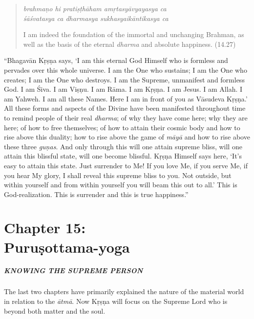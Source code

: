 \documentclass[12pt, twoside, openright]{memoir}
\begin{document}
\par
\begin{verse}
\textit{brahmaṇo hi pratiṣṭhāham amṛtasyāvyayasya ca} \\
\textit{śāśvatasya ca dharmasya sukhasyaikāntikasya ca}

\noindent I am indeed the foundation of the immortal and unchanging Brahman, as well as the basis of the eternal \textit{dharma} and absolute happiness. (14.27)
\end{verse}
\par



\enquote{Bhagavān Kṛṣṇa says, \enquote{I am this eternal God Himself who is formless and pervades over this whole universe. I am the One who sustains; I am the One who creates; I am the One who destroys. I am the Supreme, unmanifest and formless God. I am Śiva. I am Viṣṇu. I am Rāma. I am Kṛṣṇa. I am Jesus. I am Allah. I am Yahweh. I am all these Names. Here I am in front of you as Vāsudeva Kṛṣṇa.} All these forms and aspects of the Divine have been manifested throughout time to remind people of their real \textit{dharma}; of why they have come here; why they are here; of how to free themselves; of how to attain their cosmic body and how to rise above this duality; how to rise above the game of \textit{māyā} and how to rise above these three \textit{guṇas}. And only through this will one attain supreme bliss, will one attain this blissful state, will one become blissful. Kṛṣṇa Himself says here, \enquote{It’s easy to attain this state. Just surrender to Me! If you love Me, if you serve Me, if you hear My glory, I shall reveal this supreme bliss to you. Not outside, but within yourself and from within yourself you will beam this out to all.} This is God-realization. This is surrender and this is true happiness.}
 \chapter{Chapter 15: \\Puruṣottama-yoga}\label{chap-purusottama-yoga}

\paragraph*{\MakeUppercase{Knowing the Supreme Person}}


\noindent The last two chapters have primarily explained the nature of the material world in relation to the \textit{ātmā}. Now Kṛṣṇa will focus on the Supreme Lord who is beyond both matter and the soul.
\end{document}
